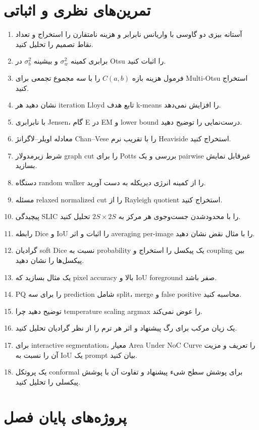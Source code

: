 \documentclass[12pt,openany,oneside]{book}
\begin{document}
\section{تمرین‌های نظری و اثباتی}
\begin{enumerate}
\item آستانه بیزی دو گاوسی با واریانس نابرابر و هزینه نامتقارن را استخراج و تعداد نقاط تصمیم را تحلیل کنید.
\item برابری کمینه \(\sigma_w^2\) و بیشینه \(\sigma_b^2\) در Otsu را اثبات کنید.
\item فرمول هزینه بازه \(C(a,b)\) را با سه مجموع تجمعی برای Multi-Otsu استخراج کنید.
\item نشان دهید هر iteration Lloyd تابع هدف k-means را افزایش نمی‌دهد.
\item با نابرابری Jensen، گام E در EM و lower bound درست‌نمایی را توضیح دهید.
\item معادله اویلر--لاگرانژ Chan--Vese را با تقریب نرم Heaviside استخراج کنید.
\item شرط زیرمدولار graph cut را برای Potts بررسی و یک pairwise غیرقابل نمایش بسازید.
\item دستگاه random walker را از کمینه انرژی دیریکله به دست آورید.
\item مسئله relaxed normalized cut را از Rayleigh quotient استخراج کنید.
\item پیچیدگی SLIC را با محدودشدن جست‌وجوی هر مرکز به \(2S\times2S\) تحلیل کنید.
\item رابطه Dice و IoU را اثبات و اثر averaging per-image را با مثال نقض نشان دهید.
\item گرادیان soft Dice نسبت به probability یک پیکسل را استخراج و coupling بین پیکسل‌ها را نشان دهید.
\item یک مثال بسازید که pixel accuracy بالا و IoU foreground صفر باشد.
\item PQ را برای سه prediction شامل split، merge و false positive محاسبه کنید.
\item توضیح دهید چرا temperature scaling argmax را عوض نمی‌کند.
\item یک زیان مرکب برای رگ پیشنهاد و اثر هر ترم را از نظر گرادیان تحلیل کنید.
\item برای interactive segmentation، معیار Area Under NoC Curve را تعریف و مزیت آن را نسبت به IoU یک prompt بیان کنید.
\item یک پروتکل conformal برای پوشش سطح شیء پیشنهاد و تفاوت آن با پوشش پیکسلی را تحلیل کنید.
\end{enumerate}

\section{پروژه‌های پایان فصل}
\end{document}
